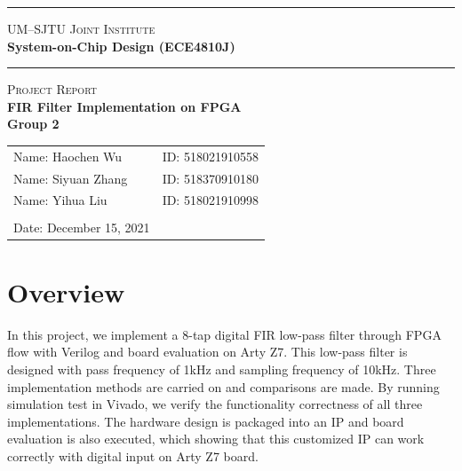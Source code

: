 \documentclass[a4paper]{article}
\begin{document}
\begin{titlepage}
    \vspace*{0.25cm}
    \noindent\rule[0.25\baselineskip]{\textwidth}{1pt}
    \begin{center}
        \huge{\textsc{UM--SJTU Joint Institute}}\vspace{0.3em}\\
        \huge{\textbf{System-on-Chip Design (ECE4810J)}}\vspace{0.3em}\\
        \noindent\rule[0.25\baselineskip]{\textwidth}{1pt}
    \end{center}
    \begin{center}
        \vspace{5cm}
        \Large{\textsc{Project Report}}\vspace{0.5em}\\
        \Large{\textbf{FIR Filter Implementation on FPGA}}\vspace{1em}\\
        \Large{\textbf{Group 2}}\\
    \end{center}
    \vfill
    \large
    \begin{tabular}{ll}
        Name: Haochen Wu \hspace*{2em}&ID: 518021910558\hspace*{2em}\\
        Name: Siyuan Zhang \hspace*{2em}&ID: 518370910180 \hspace*{2em}\\
        Name: Yihua Liu \hspace*{2em}&ID: 518021910998\hspace*{2em}\\
        \\
        Date: December 15, 2021
    \end{tabular}
\end{titlepage}
\tableofcontents
\newpage

\section{Overview}
In this project, we implement a 8-tap digital FIR low-pass filter through FPGA flow with Verilog and board evaluation on Arty Z7. This low-pass filter is designed with pass frequency of 1kHz and sampling frequency of 10kHz. Three implementation methods are carried on and comparisons are made. By running simulation test in Vivado, we verify the functionality correctness of all three implementations. The hardware design is packaged into an IP and board evaluation is also executed, which showing that this customized IP can work correctly with digital input on Arty Z7 board.
\end{document}
